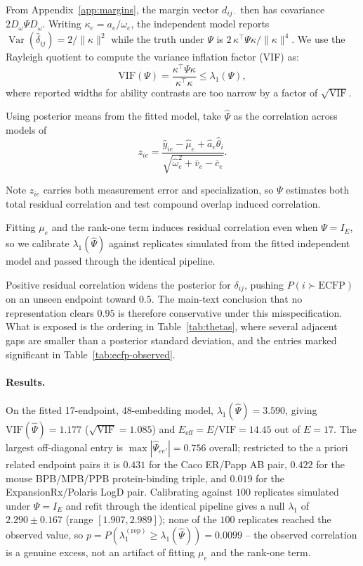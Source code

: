 \documentclass{article}
\DeclareMathOperator{\Var}{Var}
\begin{document}
From Appendix~\ref{app:margins},
the margin vector $d_{ij\cdot}$ then has covariance $2D_\omega\Psi D_\omega$.
Writing $\kappa_e = a_e/\omega_e$, the independent model reports
$\Var(\hat\delta_{ij}) = 2/\|\kappa\|^2$ while the truth under $\Psi$ is
$2\,\kappa^\top\Psi\kappa/\|\kappa\|^4$. We use the Rayleigh quotient to compute the variance inflation factor (VIF) as:
\begin{equation}
    \mathrm{VIF}(\Psi) = \frac{\kappa^\top\Psi\kappa}{\kappa^\top\kappa} \leq \lambda_1(\Psi),
  \label{eq:endpoint-vif}
\end{equation}
where reported widths for ability contrasts are too narrow by a factor of $\sqrt{\mathrm{VIF}}$.

Using posterior means from the fitted model, take $\hat\Psi$ as the correlation across
models of
\begin{equation}
  z_{ie} = \frac{\hat{y}_{ie} - \hat\mu_e + \hat{a}_e\hat\theta_i}
                {\sqrt{\hat\omega_e^2 + \bar{v}_e - \bar{c}_e}} .
\end{equation}

Note $z_{ie}$ carries both measurement error and specialization, so $\Psi$ estimates both total residual correlation and test compound overlap induced correlation.

Fitting $\mu_e$ and the rank-one term induces residual correlation even when
$\Psi = I_E$, so we calibrate $\lambda_1(\hat\Psi)$ against replicates simulated
from the fitted independent model and passed through the identical pipeline.

Positive residual correlation widens the posterior for $\delta_{ij}$, pushing
$P(i \succ \text{ECFP})$ on an unseen endpoint toward $0.5$. The main-text
conclusion that no representation clears $0.95$ is therefore conservative under
this misspecification. What is exposed is the ordering in
Table~\ref{tab:thetas}, where several adjacent gaps are smaller than a posterior
standard deviation, and the entries marked significant in
Table~\ref{tab:ecfp-observed}.

\paragraph{Results.} On the fitted 17-endpoint, 48-embedding model, $\lambda_1(\hat\Psi) = 3.590$, giving
$\mathrm{VIF}(\hat\Psi) = 1.177$ ($\sqrt{\mathrm{VIF}} = 1.085$) and $E_{\mathrm{eff}} = E/\mathrm{VIF} = 14.45$ out
of $E=17$. The largest off-diagonal entry is $\max|\hat\Psi_{ee'}| = 0.756$ overall; restricted to the a priori
related endpoint pairs it is $0.431$ for the Caco ER/Papp AB pair, $0.422$ for the mouse
BPB/MPB/PPB protein-binding triple, and $0.019$ for the ExpansionRx/Polaris LogD pair. Calibrating against
$100$ replicates simulated under $\Psi = I_E$ and refit through the identical pipeline gives a null $\lambda_1$
of $2.290 \pm 0.167$ (range $[1.907, 2.989]$); none of the $100$ replicates reached the observed value, so
$p = P(\lambda_1^{(\mathrm{rep})} \geq \lambda_1(\hat\Psi)) = 0.0099$ -- the observed correlation is a genuine
excess, not an artifact of fitting $\mu_e$ and the rank-one term.
\end{document}
